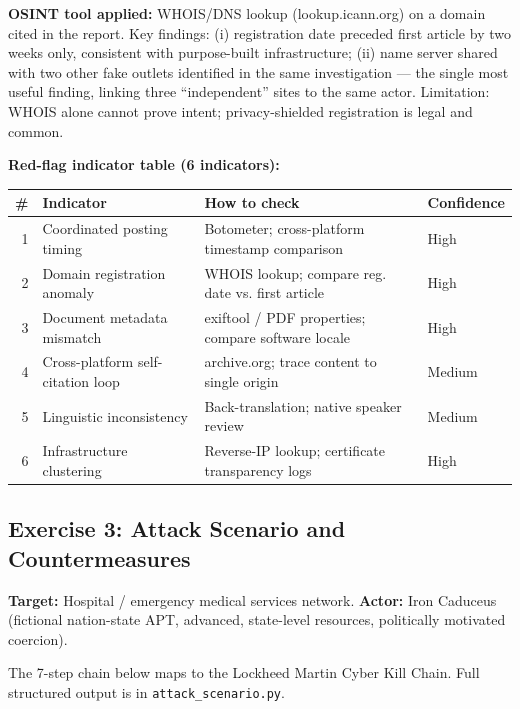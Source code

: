 \documentclass[11pt,a4paper]{article}
\begin{document}
\noindent\textbf{OSINT tool applied:} WHOIS/DNS lookup (lookup.icann.org) on a
domain cited in the report. Key findings: (i) registration date preceded first
article by two weeks only, consistent with purpose-built infrastructure;
(ii) name server shared with two other fake outlets identified in the same
investigation --- the single most useful finding, linking three ``independent''
sites to the same actor. Limitation: WHOIS alone cannot prove intent;
privacy-shielded registration is legal and common.

\noindent\textbf{Red-flag indicator table (6 indicators):}

\small
\begin{tabularx}{\linewidth}{r >{\raggedright}p{3.8cm} >{\raggedright\arraybackslash}X l}
\toprule
\# & Indicator & How to check & Confidence \\
\midrule
1 & Coordinated posting timing & Botometer; cross-platform timestamp comparison & High \\
2 & Domain registration anomaly & WHOIS lookup; compare reg. date vs. first article & High \\
3 & Document metadata mismatch & exiftool / PDF properties; compare software locale & High \\
4 & Cross-platform self-citation loop & archive.org; trace content to single origin & Medium \\
5 & Linguistic inconsistency & Back-translation; native speaker review & Medium \\
6 & Infrastructure clustering & Reverse-IP lookup; certificate transparency logs & High \\
\bottomrule
\end{tabularx}
\normalsize

\subsection{Exercise 3: Attack Scenario and Countermeasures}

\noindent\textbf{Target:} Hospital / emergency medical services network.
\noindent\textbf{Actor:} Iron Caduceus (fictional nation-state APT, advanced,
state-level resources, politically motivated coercion).

The 7-step chain below maps to the Lockheed Martin Cyber Kill Chain. Full
structured output is in \texttt{attack\_scenario.py}.
\end{document}
